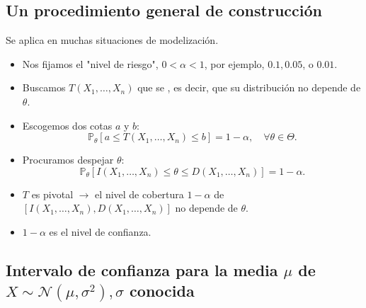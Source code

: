 \subsection{Un procedimiento general de construcción}
Se aplica en muchas situaciones de modelización.
\begin{tcolorbox}[colback=blue!5!white, colframe=blue!75!black, title=\textbf{Procedimiento}]
\begin{itemize}[label=\textbullet]
    \item Nos fijamos el "nivel de riesgo", $0<\alpha<1$, por ejemplo, $0.1,0.05$, o  $0.01$.
    \item Buscamos  $T(X_1,\dots,X_n)$ que se , es decir, que su distribución no depende de $\theta$.
    \item Escogemos dos cotas $a$ y  $b$:  \[
            \mathbb{P}_\theta[a\le T(X_1,\dots,X_n)\le b]=1-\alpha,\quad \forall \theta\in \Theta.
    \] 
\item Procuramos despejar $\theta$: \[
        \mathbb{P}_\theta[I(X_1,\dots,X_n)\le \theta\le D(X_1,\dots,X_n)]=1-\alpha.
\] 
\end{itemize}
\end{tcolorbox}
\begin{tcolorbox}[colback=red!5!white, colframe=red!75!black, title=\textbf{Nota}]
\begin{itemize}[label=\textbullet]
    \item $T$ es pivotal $\longrightarrow $ el nivel de cobertura $1-\alpha$ de $[I(X_1,\dots,X_n),D(X_1,\dots,X_n)]$ no depende de $\theta$.
    \item $1-\alpha$ es el nivel de confianza.
\end{itemize}
\end{tcolorbox}
\subsection{Intervalo de confianza para la media $\mu$ de $X\sim \mathcal{N}(\mu,\sigma^2),\sigma$ conocida}

